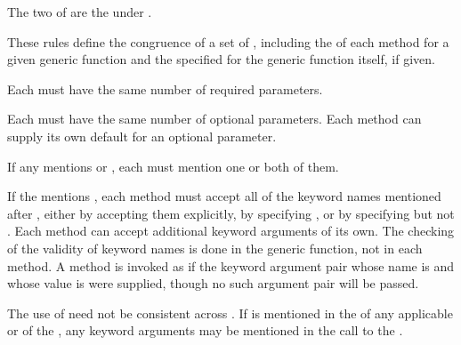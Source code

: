  The two  of  are the  
under .


\endlist

\endSubsection%


These rules define the congruence of a set of , including the
 of each method for a given generic function and the
 specified for the generic function itself, if given.

\beginlist

 Each  must have the same number of required
parameters.

 Each  must have the same number of optional
parameters.  Each method can supply its own default for an optional
parameter.
                                       
 If any  mentions  or , each
 must mention one or both of them.
                                                        
 If the  
mentions , each
method must accept all of the keyword names mentioned after ,
either by accepting them explicitly, by specifying ,
or by specifying  but not .
Each method can accept additional keyword arguments of its own.  The
checking of the validity of keyword names is done in the generic
function, not in each method.
A method is invoked as if the keyword
argument pair whose name is  and whose value
is  were supplied, though no such argument pair will be passed.
                      
 The use of  need not be consistent
across .  If  is mentioned in 
the  of any applicable  or of the ,
any keyword arguments may be mentioned in the call to the .
                      
